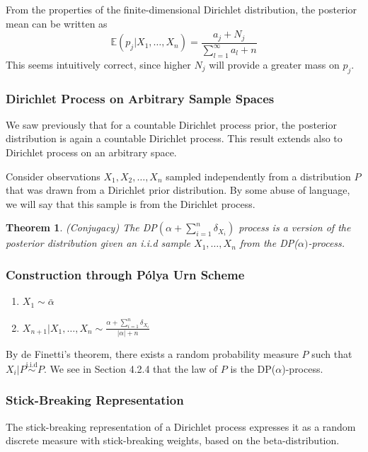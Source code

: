 \documentclass[a4paper,11pt]{article}
\theoremstyle{theorem}
\newtheorem{thm}{Theorem}
\theoremstyle{definition}
\providecommand{\E}{\mathbb{E}}
\begin{document}
From the properties of the finite-dimensional Dirichlet distribution, the posterior mean can be written as
\[
\E \left(p_j | X_1, \dotsc, X_n \right) = \frac{a_j + N_j}{\sum_{l=1}^{\infty}{a_l} + n}
\]
This seems intuitively correct, since higher $N_j$ will provide a greater mass on $p_j$.

\subsubsection{Dirichlet Process on Arbitrary Sample Spaces}

We saw previously that for a countable Dirichlet process prior, the posterior distribution is again a countable Dirichlet process. This result extends also to Dirichlet process on an arbitrary space.

Consider observations $X_1, X_2, \dotsc, X_n$ sampled independently from a distribution $P$ that was drawn from a Dirichlet prior distribution. By some abuse of language, we will say that this sample is from the Dirichlet process.

\begin{thm}
(Conjugacy) The DP$\left(\alpha + \sum_{i=1}^{n}{\delta_{X_i}}\right)$ process is a version of the posterior distribution given an i.i.d sample $X_1, \dotsc, X_n$ from the DP($\alpha)$-process.
\end{thm}

\subsubsection{Construction through P\'{o}lya Urn Scheme}

\begin{enumerate}
\item $X_1 \sim \bar{\alpha}$
\item $X_{n+1} | X_1, \dotsc, X_n \sim \frac{\alpha + \sum_{i=1}^{n}{\delta_{X_i}}}{|\alpha| + n}$
\end{enumerate}

By de Finetti's theorem, there exists a random probability measure $P$ such that $X_i | P \overset{\text{i.i.d}}{\sim} P$. We see in Section 4.2.4 that the law of $P$ is the DP($\alpha$)-process.

\subsubsection{Stick-Breaking Representation}

The stick-breaking representation of a Dirichlet process expresses it as a random discrete measure with stick-breaking weights, based on the beta-distribution.
\end{document}
